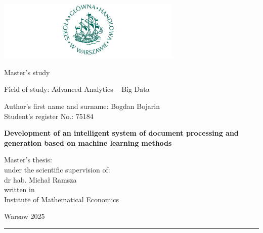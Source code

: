 \documentclass[english, twoside, 12pt, a4paper]{article}
\theoremstyle{definition}
\theoremstyle{plain}
\theoremstyle{remark}
\begin{document}
\begin{titlepage}
\centering

\includegraphics[width=0.66\textwidth]{logo.JPG}

\vspace*{0.5cm}
Master's study\\
\begin{flushleft}
Field of study: Advanced Analytics – Big Data\\
\end{flushleft}

\vspace*{.5cm}
\rule{0cm}{1cm}\hfill
\begin{minipage}{9cm}
Author's first name and surname: Bogdan Bojarin\\
Student's register No.: 75184
\end{minipage}

\vspace*{1cm}
\begin{minipage}{12cm}
\centering
\Large
\textbf{Development of an intelligent system of document processing and generation based on machine learning methods}
\end{minipage}

\vspace*{2cm}
\rule{0cm}{1cm}\hfill
\begin{minipage}{9cm}
Master's thesis:\\
under the scientific supervision of:\\
dr hab. Michał Ramsza\\
written in\\
Institute of Mathematical Economics\\
\end{minipage}

\vfill
Warsaw 2025
\end{titlepage}

\rule{1ex}{0ex}\clearpage

\cleardoublepage
\tableofcontents
\end{document}
